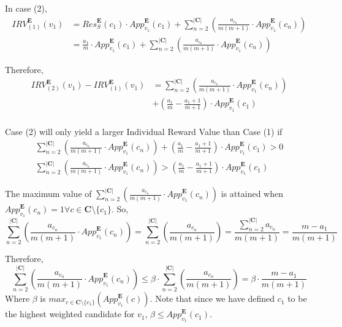 \documentclass{article}
\begin{document}
In case (2), 
\begin{equation}
\begin{aligned}
{IRV}^{\pmb{E}}_{(1)}(v_1) 
&= {Res}^{\pmb{E}}_{S}(c_1)\cdot{App}^{\pmb{E}}_{v_1}(c_1) + \sum^{|\pmb{C}|}_{n = 2}{\left(\frac{a_{c_n}}{m(m+1)}\cdot{App}^{\pmb{E}}_{v_1}(c_{n})\right)}\\
&= \frac{a_1}{m}\cdot{App}^{\pmb{E}}_{v_1}(c_1) + \sum^{|\pmb{C}|}_{n = 2}{\left(\frac{a_{c_n}}{m(m+1)}\cdot{App}^{\pmb{E}}_{v_1}(c_{n})\right)}
\end{aligned}  
\end{equation}

Therefore,
\begin{equation}\label{IRV_DIFF}
\begin{aligned}
{IRV}^{\pmb{E}}_{(2)}(v_1) - {IRV}^{\pmb{E}}_{(1)}(v_1)
&=  \sum^{|\pmb{C}|}_{n = 2}{\left(\frac{a_{c_{n}}}{m(m+1)}\cdot{App}^{\pmb{E}}_{v_1}(c_{n})\right)}\\
&+ \left(\frac{a_1}{m}-\frac{a_{1}+1}{m+1}\right)\cdot{App}^{\pmb{E}}_{v_1}(c_1)\\
\end{aligned}  
\end{equation}

Case (2) will only yield a larger Individual Reward Value than Case (1) if 
\begin{gather}
\sum^{|\pmb{C}|}_{n = 2}{\left(\frac{a_{c_{n}}}{m(m+1)}\cdot{App}^{\pmb{E}}_{v_1}(c_{n})\right)} + \left(\frac{a_1}{m}-\frac{a_{1}+1}{m+1}\right)\cdot{App}^{\pmb{E}}_{v_1}(c_1) > 0\nonumber\\
\sum^{|\pmb{C}|}_{n = 2}{\left(\frac{a_{c_{n}}}{m(m+1)}\cdot{App}^{\pmb{E}}_{v_1}(c_{n})\right)} > \left(\frac{a_1}{m}-\frac{a_{1}+1}{m+1}\right)\cdot{App}^{\pmb{E}}_{v_1}(c_1)
\end{gather}

The maximum value of $\sum^{|\pmb{C}|}_{n = 2}{\left(\frac{a_{c_{n}}}{m(m+1)}\cdot{App}^{\pmb{E}}_{v_1}(c_{n})\right)}$ is attained when ${App}^{\pmb{E}}_{v_1}(c_{n}) = 1 \forall {c} \in \pmb{C} \setminus \{c_1\}$. So,
\begin{equation}
\sum^{|\pmb{C}|}_{n = 2}{\left(\frac{a_{c_{n}}}{m(m+1)}\cdot{App}^{\pmb{E}}_{v_1}(c_{n})\right)} = \sum^{|\pmb{C}|}_{n = 2}{\left(\frac{a_{c_{n}}}{m(m+1)}\right)} = \frac{\sum^{|\pmb{C}|}_{n = 2}{a_{c_{n}}}}{m(m+1)} = \frac{m-a_1}{m(m+1)}
\end{equation}

Therefore,
\begin{equation}
\sum^{|\pmb{C}|}_{n = 2}{\left(\frac{a_{c_{n}}}{m(m+1)}\cdot{App}^{\pmb{E}}_{v_1}(c_{n})\right)} \leq \beta\cdot\sum^{|\pmb{C}|}_{n = 2}{\left(\frac{a_{c_{n}}}{m(m+1)}\right)} = \beta\cdot\frac{m-a_1}{m(m+1)}
\end{equation}
Where $\beta$ is ${max}_{c \in \pmb{C} \setminus \{c_1\}}\left({App}^{\pmb{E}}_{v_1}(c)\right)$. Note that since we have defined $c_1$ to be the highest weighted candidate for $v_1$, $\beta \leq {App}^{\pmb{E}}_{v_1}(c_1)$.\\
\end{document}
